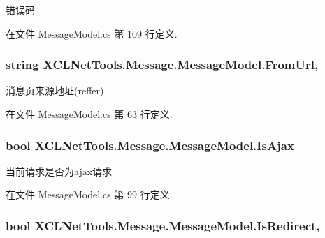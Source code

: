 错误码 



在文件 Message\-Model.\-cs 第 109 行定义.

\hypertarget{class_x_c_l_net_tools_1_1_message_1_1_message_model_afa48da00ef35d78d182c025a1f0dcbc0}{
\subsubsection[{From\-Url}]{\setlength{\rightskip}{0pt plus 5cm}string X\-C\-L\-Net\-Tools.\-Message.\-Message\-Model.\-From\-Url\hspace{0.3cm}{\ttfamily [get]}, {\ttfamily [set]}}}\label{class_x_c_l_net_tools_1_1_message_1_1_message_model_afa48da00ef35d78d182c025a1f0dcbc0}


消息页来源地址(reffer) 



在文件 Message\-Model.\-cs 第 63 行定义.

\hypertarget{class_x_c_l_net_tools_1_1_message_1_1_message_model_ad0286a8e34c0cd7495034ac04c4d0ada}{
\subsubsection[{Is\-Ajax}]{\setlength{\rightskip}{0pt plus 5cm}bool X\-C\-L\-Net\-Tools.\-Message.\-Message\-Model.\-Is\-Ajax\hspace{0.3cm}{\ttfamily [get]}}}\label{class_x_c_l_net_tools_1_1_message_1_1_message_model_ad0286a8e34c0cd7495034ac04c4d0ada}


当前请求是否为ajax请求 



在文件 Message\-Model.\-cs 第 99 行定义.

\hypertarget{class_x_c_l_net_tools_1_1_message_1_1_message_model_a167c5dfe1818b0685dc7ceca3c1ed5ba}{
\subsubsection[{Is\-Redirect}]{\setlength{\rightskip}{0pt plus 5cm}bool X\-C\-L\-Net\-Tools.\-Message.\-Message\-Model.\-Is\-Redirect\hspace{0.3cm}{\ttfamily [get]}, {\ttfamily [set]}}}\label{class_x_c_l_net_tools_1_1_message_1_1_message_model_a167c5dfe1818b0685dc7ceca3c1ed5ba}


